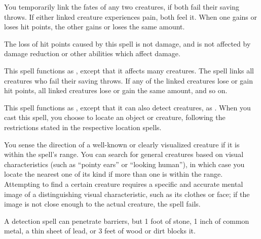 \spelldur{\durshort}
\begin{spelleffect}
  You temporarily link the fates of any two creatures, if both fail their saving throws. If either linked creature experiences pain, both feel it. When one gains or loses hit points, the other gains or loses the same amount.
\end{spelleffect}
\begin{spellnotes}
  The loss of hit points caused by this spell is not damage, and is not affected by damage reduction or other abilities which affect damage.
\end{spellnotes}

\begin{spelleffect}
  This spell functions as , except that it affects many creatures. The spell links all creatures who fail their saving throws. If any of the linked creatures lose or gain hit points, all linked creatures lose or gain the same amount, and so on.
\end{spelleffect}

\spellrng{\rngext}
\begin{spelleffect}
  This spell functions as , except that it can also detect creatures, as . When you cast this spell, you choose to locate an object or creature, following the restrictions stated in the respective location spells.
\end{spelleffect}

\spellrng{\rngmed}
\begin{spelleffect}
  You sense the direction of a well-known or clearly visualized creature if it is within the spell's range. You can search for general creatures based on visual characteristics (such as ``pointy ears'' or ``looking human''), in which case you locate the nearest one of its kind if more than one is within the range. Attempting to find a certain creature requires a specific and accurate mental image of a distinguishing visual characteristic, such as its clothes or face; if the image is not close enough to the actual creature, the spell fails.
\end{spelleffect}
\begin{spellnotes}
  A detection spell can penetrate barriers, but 1 foot of stone, 1 inch of common metal, a thin sheet of lead, or 3 feet of wood or dirt blocks it.
\end{spellnotes}

